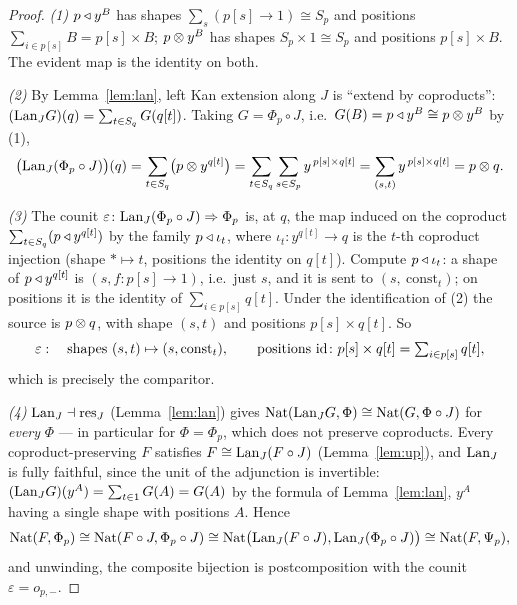 \begin{proof}
\emph{(1)} $p\mathbin{\triangleleft} y^B$ has shapes $\sum_s(p[s]\to 1)\cong S_p$ and positions
$\sum_{i\in p[s]}B=p[s]\times B$; $p\mathbin{\otimes} y^B$ has shapes $S_p\times 1\cong S_p$
and positions $p[s]\times B$. The evident map is the identity on both.

\emph{(2)} By Lemma~\ref{lem:lan}, left Kan extension along $J$ is ``extend by
coproducts'': $(\mathrm{Lan}_J G)(q)=\sum_{t\in S_q}G(q[t])$. Taking $G=\Phi_p\circ J$,
i.e.\ $G(B)=p\mathbin{\triangleleft} y^B\cong p\mathbin{\otimes} y^B$ by (1),
\[
  \bigl(\mathrm{Lan}_J(\Phi_p\circ J)\bigr)(q)
  =\sum_{t\in S_q}\bigl(p\mathbin{\otimes} y^{q[t]}\bigr)
  =\sum_{t\in S_q}\sum_{s\in S_p} y^{\,p[s]\times q[t]}
  =\sum_{(s,t)} y^{\,p[s]\times q[t]}
  = p\mathbin{\otimes} q .
\]

\emph{(3)} The counit $\varepsilon\colon\mathrm{Lan}_J(\Phi_p\circ J)\Rightarrow\Phi_p$
is, at $q$, the map induced on the coproduct $\sum_{t\in S_q}(p\mathbin{\triangleleft} y^{q[t]})$ by
the family $p\mathbin{\triangleleft}\iota_t$, where $\iota_t\colon y^{q[t]}\to q$ is the $t$-th
coproduct injection (shape $\ast\mapsto t$, positions the identity on $q[t]$).
Compute $p\mathbin{\triangleleft}\iota_t$: a shape of $p\mathbin{\triangleleft} y^{q[t]}$ is $(s,f\colon p[s]\to 1)$,
i.e.\ just $s$, and it is sent to $(s,\ \mathrm{const}_t)$; on positions it is
the identity of $\sum_{i\in p[s]}q[t]$. Under the identification of (2) the
source is $p\mathbin{\otimes} q$, with shape $(s,t)$ and positions $p[s]\times q[t]$. So
\[
   \varepsilon:\quad
   \text{shapes } (s,t)\mapsto (s,\mathrm{const}_t),\qquad
   \text{positions } \mathrm{id}\colon p[s]\times q[t]=\textstyle\sum_{i\in p[s]}q[t],
\]
which is precisely the comparitor.

\emph{(4)} $\mathrm{Lan}_J\dashv\mathrm{res}_J$ (Lemma~\ref{lem:lan}) gives
$\operatorname{Nat}(\mathrm{Lan}_J G,\Phi)\cong\operatorname{Nat}(G,\Phi\circ J)$ for \emph{every} $\Phi$ ---
in particular for $\Phi=\Phi_p$, which does not preserve coproducts. Every
coproduct-preserving $F$ satisfies $F\cong\mathrm{Lan}_J(F\circ J)$
(Lemma~\ref{lem:up}), and $\mathrm{Lan}_J$ is fully faithful, since the unit of the
adjunction is invertible: $(\mathrm{Lan}_J G)(y^A)=\sum_{t\in 1}G(A)=G(A)$ by the
formula of Lemma~\ref{lem:lan}, $y^A$ having a single shape with positions $A$.
Hence
\[
  \operatorname{Nat}(F,\Phi_p)\cong\operatorname{Nat}(F\circ J,\Phi_p\circ J)
   \cong\operatorname{Nat}\bigl(\mathrm{Lan}_J(F\circ J),\mathrm{Lan}_J(\Phi_p\circ J)\bigr)\cong\operatorname{Nat}(F,\Psi_p),
\]
and unwinding, the composite bijection is postcomposition with the counit
$\varepsilon=o_{p,-}$.
\end{proof}

